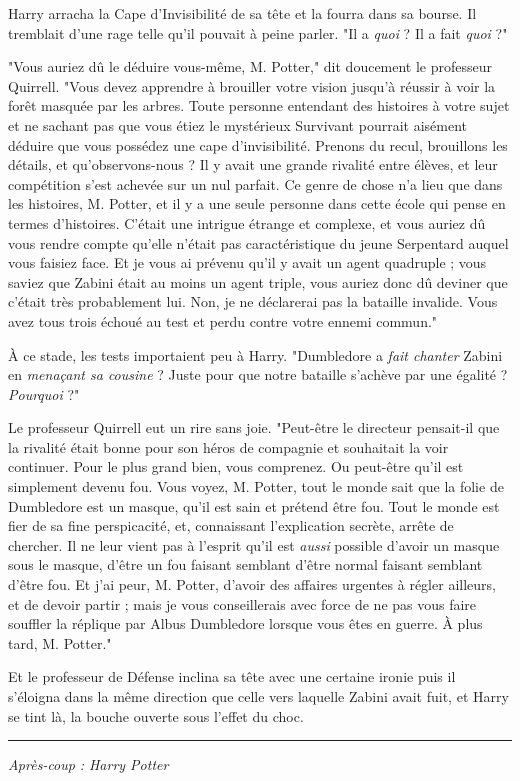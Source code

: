 Harry arracha la Cape d'Invisibilité de sa tête et la fourra dans sa bourse. Il tremblait d'une rage telle qu'il pouvait à peine parler. "Il a \emph{quoi}  ? Il a fait \emph{quoi}  ?"

"Vous auriez dû le déduire vous-même, M. Potter," dit doucement le professeur Quirrell. "Vous devez apprendre à brouiller votre vision jusqu'à réussir à voir la forêt masquée par les arbres. Toute personne entendant des histoires à votre sujet et ne sachant pas que vous étiez le mystérieux Survivant pourrait aisément déduire que vous possédez une cape d'invisibilité. Prenons du recul, brouillons les détails, et qu'observons-nous ? Il y avait une grande rivalité entre élèves, et leur compétition s'est achevée sur un nul parfait. Ce genre de chose n'a lieu que dans les histoires, M. Potter, et il y a une seule personne dans cette école qui pense en termes d'histoires. C'était une intrigue étrange et complexe, et vous auriez dû vous rendre compte qu'elle n'était pas caractéristique du jeune Serpentard auquel vous faisiez face. Et je vous ai prévenu qu'il y avait un agent quadruple ; vous saviez que Zabini était au moins un agent triple, vous auriez donc dû deviner que c'était très probablement lui. Non, je ne déclarerai pas la bataille invalide. Vous avez tous trois échoué au test et perdu contre votre ennemi commun."

À ce stade, les tests importaient peu à Harry. "Dumbledore a \emph{fait chanter}  Zabini en \emph{menaçant sa cousine}  ? Juste pour que notre bataille s'achève par une égalité ? \emph{Pourquoi}  ?"

Le professeur Quirrell eut un rire sans joie. "Peut-être le directeur pensait-il que la rivalité était bonne pour son héros de compagnie et souhaitait la voir continuer. Pour le plus grand bien, vous comprenez. Ou peut-être qu'il est simplement devenu fou. Vous voyez, M. Potter, tout le monde sait que la folie de Dumbledore est un masque, qu'il est sain et prétend être fou. Tout le monde est fier de sa fine perspicacité, et, connaissant l'explication secrète, arrête de chercher. Il ne leur vient pas à l'esprit qu'il est \emph{aussi}  possible d'avoir un masque sous le masque, d'être un fou faisant semblant d'être normal faisant semblant d'être fou. Et j'ai peur, M. Potter, d'avoir des affaires urgentes à régler ailleurs, et de devoir partir ; mais je vous conseillerais avec force de ne pas vous faire souffler la réplique par Albus Dumbledore lorsque vous êtes en guerre. À plus tard, M. Potter."

Et le professeur de Défense inclina sa tête avec une certaine ironie puis il s'éloigna dans la même direction que celle vers laquelle Zabini avait fuit, et Harry se tint là, la bouche ouverte sous l'effet du choc.
\par\noindent\rule{\textwidth}{0.4pt}
\emph{Après-coup}  \emph{: Harry Potter} 

